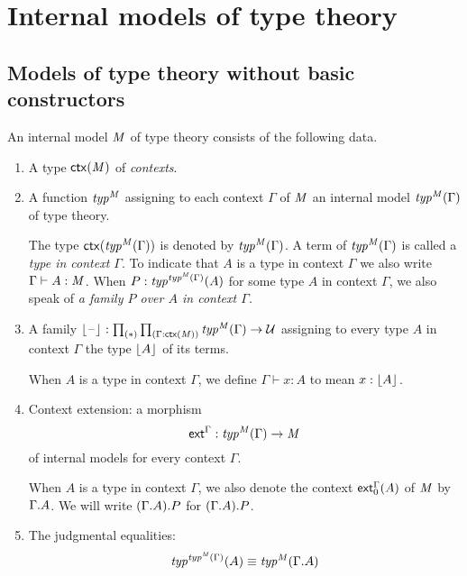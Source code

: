 \section{Internal models of type theory}
\subsection{Models of type theory without basic constructors}\label{internal-model-contexts}
\begin{defn}\label{defn:premodel}
An internal model $\mathit{M}$ of type theory consists of the following data. 
\begin{enumerate}
\item A type $\mathsf{ctx}(\mathit{M})$ of \emph{contexts}.
\item A function ${\mathit{typ}^{\mathit{M}}}$ assigning to each context $\Gamma$ of $\mathit{M}$ an internal model
${{\mathit{typ}^{\mathit{M}}}(\Gamma)}$ of type theory.
\begin{defn}
The type $\mathsf{ctx}({{\mathit{typ}^{\mathit{M}}}(\Gamma)})$ is denoted by ${{\mathit{typ}^{\mathit{M}}}(\Gamma)}$. A
term of ${{\mathit{typ}^{\mathit{M}}}(\Gamma)}$ is called a \emph{type in context $\Gamma$}. To indicate
that $A$ is a type in context $\Gamma$ we also write $\Gamma\vdash A:\mathit{M}$. 
When $P:{{\mathit{typ}^{{{\mathit{typ}^{\mathit{M}}}(\Gamma)}}}(A)}$ for some type $A$ in context $\Gamma$, we
also speak of \emph{a family $P$ over $A$ in context $\Gamma$.}
\end{defn}
\item A family $\terms{\blank}:\prd*{\Gamma:\ctx(\mfM)}\mftyp{\mfM}{\Gamma}\to\type$
assigning to every type $A$ in context $\Gamma$ the type $\lfloor A \rfloor^{}$ of its
terms.
\begin{defn}
When $A$ is a type in context $\Gamma$, we define $\Gamma\vdash x:A$ 
to mean $x:\lfloor A \rfloor^{}$.
\end{defn}
\item Context extension: a morphism
\begin{equation*}
\mathsf{ext}^\Gamma:{{\mathit{typ}^{\mathit{M}}}(\Gamma)}\to\mathit{M}
\end{equation*}
of internal models for every context $\Gamma$.
\begin{defn}
When $A$ is a type in context $\Gamma$, we also denote
the context $\mathsf{ext}^\Gamma_0(A)$ of $\mathit{M}$ by $\ctxext{\Gamma}{A}$.
We will write
$\ctxext{{\Gamma}{A}}{P}$ for $\ctxext{{\Gamma}{A}}{P}$.
\end{defn}
\item The judgmental equalities:
\begin{align*}
\mftyp{\mftyp{\mfM}{\Gamma}}{A} & \jdeq\mftyp{\mfM}{\ctxext{\Gamma}{A}}\\

\end{align*}
\end{enumerate}
\end{defn}
